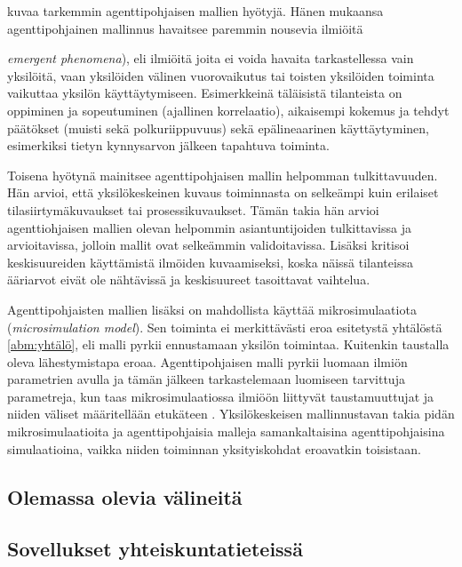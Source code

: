 \documentclass[finnish,gradu,twoside,12pt]{tktltiki}
\begin{document}
\citet{Bonabeau2002} kuvaa tarkemmin agenttipohjaisen mallien hyötyjä. Hänen mukaansa agenttipohjainen mallinnus havaitsee paremmin nousevia ilmiöitä {\textit{emergent phenomena}), eli ilmiöitä joita ei voida havaita tarkastellessa vain yksilöitä, vaan yksilöiden välinen vuorovaikutus tai toisten yksilöiden toiminta vaikuttaa yksilön käyttäytymiseen. Esimerkkeinä täläisistä tilanteista on oppiminen ja sopeutuminen (ajallinen korrelaatio), aikaisempi kokemus ja tehdyt päätökset (muisti sekä polkuriippuvuus) sekä epälineaarinen käyttäytyminen, esimerkiksi tietyn kynnysarvon jälkeen tapahtuva toiminta.

Toisena hyötynä \citet{Bonabeau2002} mainitsee agenttipohjaisen mallin helpomman tulkittavuuden. Hän arvioi, että yksilökeskeinen kuvaus toiminnasta on selkeämpi kuin erilaiset tilasiirtymäkuvaukset tai prosessikuvaukset. Tämän takia hän arvioi agenttiohjaisen mallien olevan helpommin asiantuntijoiden tulkittavissa ja arvioitavissa, jolloin mallit ovat selkeämmin validoitavissa. Lisäksi \citet{Bonabeau2002} kritisoi keskisuureiden käyttämistä ilmöiden kuvaamiseksi, koska näissä tilanteissa ääriarvot eivät ole nähtävissä ja keskisuureet tasoittavat vaihtelua.

Agenttipohjaisten mallien lisäksi on mahdollista käyttää mikrosimulaatiota  (\textit{microsimulation model}). Sen toiminta ei merkittävästi eroa esitetystä yhtälöstä \ref{abm:yhtälö}, eli malli pyrkii ennustamaan yksilön toimintaa. Kuitenkin taustalla oleva lähestymistapa eroaa. Agenttipohjaisen malli pyrkii luomaan ilmiön parametrien avulla ja tämän jälkeen tarkastelemaan luomiseen tarvittuja parametreja, kun taas mikrosimulaatiossa ilmiöön liittyvät taustamuuttujat ja niiden väliset määritellään etukäteen \citep[58--59]{Gilbert2005}. Yksilökeskeisen mallinnustavan takia pidän mikrosimulaatioita ja agenttipohjaisia malleja samankaltaisina agenttipohjaisina simulaatioina, vaikka niiden toiminnan yksityiskohdat eroavatkin toisistaan.

\subsection{Olemassa olevia välineitä}

\subsection{Sovellukset yhteiskuntatieteissä}

\citet{VonRandow2011}

\newpage

}
\end{document}
